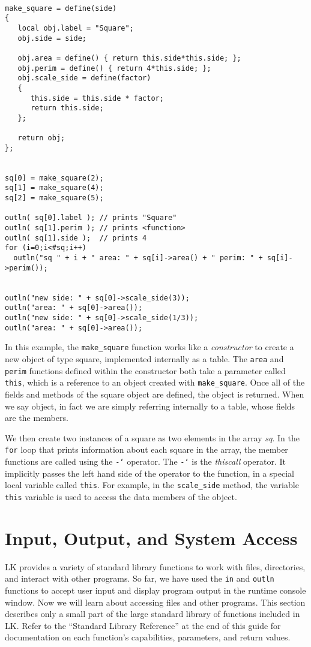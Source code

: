 \documentclass{article}
\newcommand\gt{\char`\>}
\begin{document}
\begin{verbatim}

make_square = define(side)
{
   local obj.label = "Square";
   obj.side = side;

   obj.area = define() { return this.side*this.side; };  
   obj.perim = define() { return 4*this.side; };
   obj.scale_side = define(factor)
   {
      this.side = this.side * factor;
      return this.side;
   };
   
   return obj;
};


sq[0] = make_square(2);
sq[1] = make_square(4);
sq[2] = make_square(5);

outln( sq[0].label ); // prints "Square"
outln( sq[1].perim ); // prints <function>
outln( sq[1].side );  // prints 4
for (i=0;i<#sq;i++)
  outln("sq " + i + " area: " + sq[i]->area() + " perim: " + sq[i]->perim());


outln("new side: " + sq[0]->scale_side(3));
outln("area: " + sq[0]->area());
outln("new side: " + sq[0]->scale_side(1/3));
outln("area: " + sq[0]->area());
\end{verbatim}

In this example, the \texttt{make\_square} function works like a \emph{constructor} to create a new object of type square, implemented internally as a table.  The \texttt{area} and \texttt{perim} functions defined within the constructor both take a parameter called \texttt{this}, which is a reference to an object created with \texttt{make\_square}.  Once all of the fields and methods of the square object are defined, the object is returned.  When we say object, in fact we are simply referring internally to a table, whose fields are the members.

We then create two instances of a square as two elements in the array \emph{sq}.  In the \texttt{for} loop that prints information about each square in the array, the member functions are called using the \texttt{-\gt} operator.  The \texttt{-\gt} is the \emph{thiscall} operator.  It implicitly passes the left hand side of the operator to the function, in a special local variable called \texttt{this}.  For example, in the \texttt{scale\_side} method, the variable \texttt{this} variable is used to access the data members of the object.


\section{Input, Output, and System Access}

LK provides a variety of standard library functions to work with files, directories, and interact with other programs.  So far, we have used the \texttt{in} and \texttt{outln} functions to accept user input and display program output in the runtime console window.  Now we will learn about accessing files and other programs.  This section describes only a small part of the large standard library of functions included in LK.  Refer to the ``Standard Library Reference'' at the end of this guide for documentation on each function's capabilities, parameters, and return values.  
\end{document}
